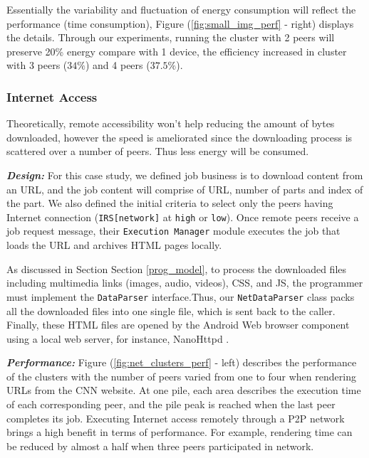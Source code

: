 \documentclass{sig-alternate}
\begin{document}
Essentially the variability and fluctuation of energy consumption will reflect the performance (time consumption), Figure (\ref{fig:small_img_perf} - right) displays the details. Through our experiments, running the cluster with 2 peers will preserve 20\% energy compare with 1 device, the efficiency increased in cluster with 3 peers ($34\%$) and 4 peers ($37.5\%$).


\subsubsection{Internet Access} 
Theoretically, remote accessibility won't help reducing the amount of bytes downloaded, however the speed is ameliorated since the downloading process is scattered over a number of peers. Thus less energy will be consumed. 

\textbf{\emph{Design:}}
For this case study, we defined job business is to download content from an URL, and the job content will comprise of URL, number of parts and index of the part. We also defined the initial criteria to select only the peers having Internet connection (\texttt{IRS[network]} at \texttt{high} or \texttt{low}). Once 
remote peers receive a job request message, their \texttt{Execution Manager} module executes the job that loads the URL and archives HTML pages locally. 

As discussed in Section Section \ref{prog_model}, to process the downloaded files including multimedia links (images, audio, videos), CSS, and JS, the programmer must implement the \texttt{DataParser} interface.Thus, our \texttt{NetDataParser} class packs all the downloaded files into one single file, which is sent back to the caller. Finally, these HTML files are opened by the Android Web browser component using a local web server, for instance, NanoHttpd \cite{nanohttpd}.

\textbf{\emph{Performance:}}
Figure (\ref{fig:net_clusters_perf} - left) describes the performance of the clusters with the number of peers varied from one to four when rendering URLs from the CNN website. At one pile, each area describes the execution time of each corresponding peer, and the pile peak is reached when the last peer completes its job. Executing Internet access remotely through a P2P network brings a high benefit in terms of performance. For example, rendering time can be reduced by almost a half when three peers participated in network. 
\end{document}
